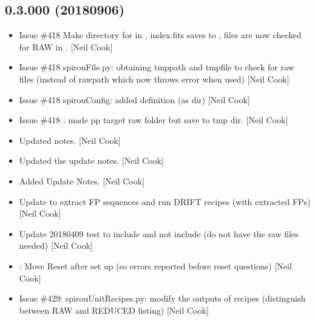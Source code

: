 \documentclass[a4paper,10pt,english]{report}
\begin{document}
\subsection{0.3.000 (2018\sphinxhyphen{}09\sphinxhyphen{}06)}
\label{\detokenize{misc/changelog:id353}}\begin{itemize}
\item {} 
Issue \#418  \sphinxhyphen{} Make directory for  in
, index.fits saves to , files are now checked for RAW in
. {[}Neil Cook{]}

\item {} 
Issue \#418 spirouFile.py: obtaining tmppath and tmpfile to check for
raw files (instead of rawpath which now throws error when used) {[}Neil
Cook{]}

\item {} 
Issue \#418 spirouConfig: added  definition (as 
dir) {[}Neil Cook{]}

\item {} 
Issue \#418 : made pp target raw folder but
save to tmp dir. {[}Neil Cook{]}

\item {} 
Updated notes. {[}Neil Cook{]}

\item {} 
Updated the update notes. {[}Neil Cook{]}

\item {} 
Added Update Notes. {[}Neil Cook{]}

\item {} 
Update  to extract FP sequences and run DRIFT
recipes (with extracted FPs) {[}Neil Cook{]}

\item {} 
Update 20180409 test to include  and not include
 (do not have the raw files needed) {[}Neil Cook{]}

\item {} 
: Move Reset after set up (so errors reported before reset
questions) {[}Neil Cook{]}

\item {} 
Issue \#429: spirouUnitRecipes.py: modify the outputs of 
recipes (distinguish between RAW and REDUCED listing) {[}Neil Cook{]}


\end{itemize}
\end{document}
